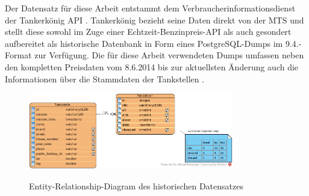 Der Datensatz für diese Arbeit entstammt dem Verbraucherinformationsdienst der \glqq Tankerkönig API \grqq. Tankerkönig bezieht seine Daten direkt von der MTS  und stellt diese sowohl im Zuge einer Echtzeit-Benzinpreis-API als auch gesondert aufbereitet als historische Datenbank in Form eines PostgreSQL-Dumps im 9.4.-Format zur Verfügung. Die für diese Arbeit verwendeten Dumps umfassen neben den kompletten Preisdaten vom 8.6.2014 bis zur aktuellsten Änderung auch die Informationen über die Stammdaten der Tankstellen \citep*{TkAPI}. 

\begin{figure}
	\center
	\includegraphics[width=0.8\textwidth]{Bilder/pricing_data.png}\\
	\caption{Entity-Relationship-Diagram des historischen Datensatzes}
	\label{fig:ERDT}
\end{figure}

